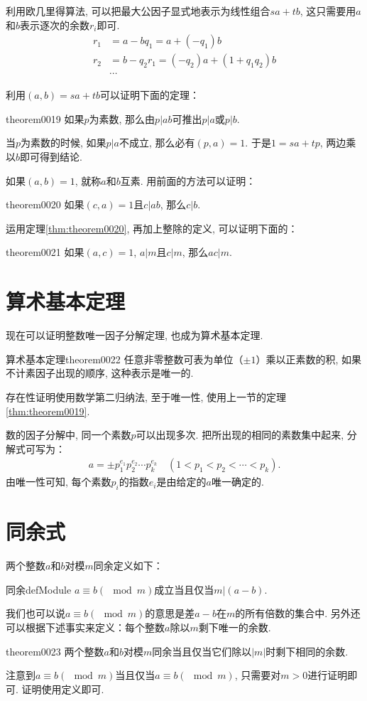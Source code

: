 利用欧几里得算法, 可以把最大公因子显式地表示为线性组合$sa+tb$, 这只需要用$a$和$b$表示逐次的余数$r_i$即可. 
\[
\begin{aligned}
r_1 &= a - bq_1 = a + (-q_1)b \\
r_2 &= b - q_2r_1 = (-q_2)a + (1 + q_1q_2)b \\
&\cdots
\end{aligned}
\]

利用$(a, b) = sa+tb$可以证明下面的定理：
\begin{theorem}{}{theorem0019}
如果$p$为素数, 那么由$p|ab$可推出$p|a$或$p|b$. 
\end{theorem}

当$p$为素数的时候, 如果$p|a$不成立, 那么必有$(p, a)=1$. 于是$1 = sa+tp$, 两边乘以$b$即可得到结论. 

如果$(a, b)=1$, 就称$a$和$b$互素. 用前面的方法可以证明：
\begin{theorem}{}{theorem0020}
如果$(c, a)=1$且$c|ab$, 那么$c|b$. 
\end{theorem}

运用定理\ref{thm:theorem0020}, 再加上整除的定义, 可以证明下面的：
\begin{theorem}{}{theorem0021}
如果$(a, c)=1$, $a|m$且$c|m$, 那么$ac|m$. 
\end{theorem}


\section{算术基本定理}\label{subsection0010108}
现在可以证明整数唯一因子分解定理, 也成为算术基本定理. 
\begin{theorem}{算术基本定理}{theorem0022}
任意非零整数可表为单位（$\pm{}1$）乘以正素数的积, 如果不计素因子出现的顺序, 这种表示是唯一的. 
\end{theorem}

存在性证明使用数学第二归纳法, 至于唯一性, 使用上一节的定理\ref{thm:theorem0019}. 

数的因子分解中, 同一个素数$p$可以出现多次. 把所出现的相同的素数集中起来, 分解式可写为：
\begin{gather}\label{equation0015}
a = \pm{}p_1^{e_1}p_2^{e_2} \cdots p_k^{e_k} \quad (1 < p_1 < p_2 < \cdots < p_k).
\end{gather}
由唯一性可知, 每个素数$p_i$的指数$e_i$是由给定的$a$唯一确定的. 


\section{同余式}\label{subsection0010109}
两个整数$a$和$b$对模$m$同余定义如下：
\begin{definition}{同余}{defModule}
$a \equiv b (\mod{m})$成立当且仅当$m|(a-b)$. 
\end{definition}
我们也可以说$a \equiv b(\mod{m})$的意思是差$a-b$在$m$的所有倍数的集合中. 另外还可以根据下述事实来定义：每个整数$a$除以$m$剩下唯一的余数. 
\begin{theorem}{}{theorem0023}
两个整数$a$和$b$对模$m$同余当且仅当它们除以$|m|$时剩下相同的余数. 
\end{theorem}
注意到$a \equiv b(\mod{m})$当且仅当$a \equiv b(\mod{m})$, 只需要对$m>0$进行证明即可. 证明使用定义即可. 

